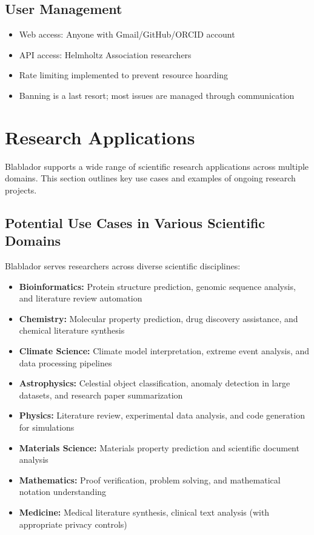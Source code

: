 \documentclass[10pt,conference]{IEEEtran}
\begin{document}
\subsection{User Management}
\begin{itemize}
    \item Web access: Anyone with Gmail/GitHub/ORCID account
    \item API access: Helmholtz Association researchers
    \item Rate limiting implemented to prevent resource hoarding
    \item Banning is a last resort; most issues are managed through communication
\end{itemize}

\section{Research Applications}

Blablador supports a wide range of scientific research applications across multiple domains. This section outlines key use cases and examples of ongoing research projects.

\subsection{Potential Use Cases in Various Scientific Domains}

Blablador serves researchers across diverse scientific disciplines:

\begin{itemize}
    \item \textbf{Bioinformatics:} Protein structure prediction, genomic sequence analysis, and literature review automation
    \item \textbf{Chemistry:} Molecular property prediction, drug discovery assistance, and chemical literature synthesis
    \item \textbf{Climate Science:} Climate model interpretation, extreme event analysis, and data processing pipelines
    \item \textbf{Astrophysics:} Celestial object classification, anomaly detection in large datasets, and research paper summarization
    \item \textbf{Physics:} Literature review, experimental data analysis, and code generation for simulations
    \item \textbf{Materials Science:} Materials property prediction and scientific document analysis
    \item \textbf{Mathematics:} Proof verification, problem solving, and mathematical notation understanding
    \item \textbf{Medicine:} Medical literature synthesis, clinical text analysis (with appropriate privacy controls)
\end{itemize}
\end{document}
